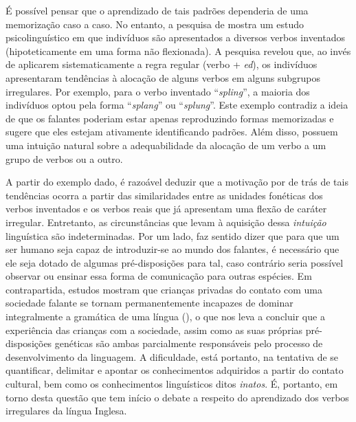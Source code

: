 É possível pensar que o aprendizado de tais padrões dependeria de uma memorização caso a caso. No entanto, a pesquisa de \cite{Bybee:1983} mostra um estudo psicolinguístico em que indivíduos são apresentados a diversos verbos inventados (hipoteticamente em uma forma não flexionada). A pesquisa revelou que, ao invés de aplicarem sistematicamente a regra regular (verbo + \textit{ed}), os indivíduos apresentaram tendências à alocação de alguns verbos em alguns subgrupos irregulares. %
Por exemplo, para o verbo inventado “\textit{spling}”, a maioria dos indivíduos optou pela forma “\textit{splang}”  ou “\textit{splung}”. Este exemplo contradiz a ideia de que os falantes poderiam estar apenas reproduzindo formas memorizadas e sugere que eles estejam ativamente identificando padrões. Além disso, possuem uma intuição natural sobre a adequabilidade da alocação de um verbo a um grupo de verbos ou a outro. 

A partir do exemplo dado, é razoável deduzir que a motivação por de trás de tais tendências ocorra a partir das similaridades entre as unidades fonéticas dos verbos inventados e os verbos reais que já apresentam uma flexão de caráter irregular. Entretanto, as circunstâncias que levam à aquisição dessa \textit{intuição} linguística são indeterminadas. Por um lado, faz sentido dizer que para que um ser humano seja capaz de introduzir-se ao mundo dos falantes, é necessário que ele seja dotado de algumas pré-disposições para tal, caso contrário seria possível observar ou ensinar essa forma de comunicação para outras espécies. Em contrapartida, estudos mostram que crianças privadas do contato com uma sociedade falante se tornam permanentemente incapazes de dominar integralmente a gramática de uma língua (\cite{Pinker:languageinstinct}), o que nos leva a concluir que a experiência das crianças com a sociedade, assim como as suas próprias pré-disposições genéticas são ambas parcialmente responsáveis pelo processo de desenvolvimento da linguagem. A dificuldade, está portanto, na tentativa de se quantificar, delimitar e apontar os conhecimentos adquiridos a partir do contato cultural, bem como os conhecimentos linguísticos ditos \textit{inatos}. É, portanto, em torno desta questão que tem início o debate a respeito do aprendizado dos verbos irregulares da língua Inglesa.

